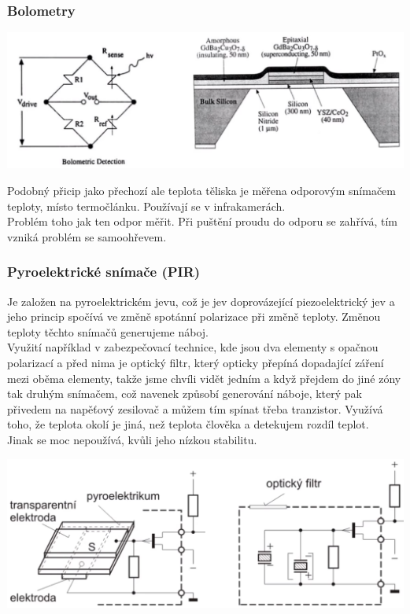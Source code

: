 \subsubsection*{Bolometry}

\includegraphics*[scale = 0.3]{img/bolometr.png}

Podobný přicip jako přechozí ale teplota těliska je měřena odporovým snímačem teploty, místo termočlánku. Používají se v infrakamerách.\\
Problém toho jak ten odpor měřit. Při puštění proudu do odporu se zahřívá, tím vzniká problém se samoohřevem.\\

\subsubsection*{Pyroelektrické snímače (PIR)}
Je založen na pyroelektrickém jevu, což je jev doprovázející piezoelektrický jev a jeho princip spočívá ve změně spotánní polarizace při změně teploty. Změnou teploty těchto snímačů generujeme náboj.\\
Využití například v zabezpečovací technice, kde jsou dva elementy s opačnou polarizací a před nima je optický filtr, který opticky přepíná dopadající záření mezi oběma elementy, takže jsme chvíli vidět jedním a když přejdem do jiné zóny tak druhým snímačem, což navenek způsobí generování náboje, který pak přivedem na napěťový zesilovač a můžem tím spínat třeba tranzistor. Využívá toho, že teplota okolí je jiná, než teplota člověka a detekujem rozdíl teplot.\\
Jinak se moc nepoužívá, kvůli jeho nízkou stabilitu.

\includegraphics*[scale = 0.2]{img/pyro.png}

